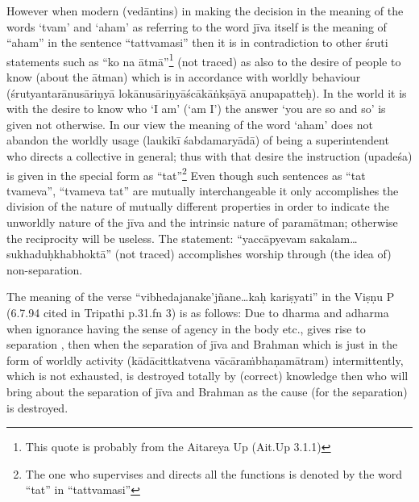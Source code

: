 However when modern (vedāntins) in making the decision in the meaning of the words ‘tvam’ and ‘aham’ as referring to    the word jīva itself is the meaning of “aham” in the sentence “tattvamasi” then it is in contradiction to other śruti statements such as “ko na ātmā”\footnote{This quote is probably from the Aitareya Up (Ait.Up 3.1.1)} (not traced) as also to the desire of people to know (about the ātman)  which is in accordance with worldly behaviour (śrutyantarānusāriṇyā lokānusāriṇyāścākāṅkṣāyā anupapatteḥ). In the world it is with the desire to know who ‘I am’ (`am I') the answer ‘you are so and so’ is given not otherwise. In our view the meaning of the word ‘aham’ does not abandon the worldly usage (laukikī śabdamaryādā) of being a superintendent who directs a collective in general; thus with that desire the instruction (upadeśa) is given in the special form as “tat”\footnote{The one who supervises and directs all the functions is denoted by the word “tat” in “tattvamasi”} Even though such sentences as “tat tvameva”, “tvameva tat” are mutually interchangeable it only accomplishes the division of the nature of mutually different properties in order to indicate the unworldly nature of the jīva and the intrinsic nature of paramātman; otherwise the reciprocity will be useless. The statement: “yaccāpyevam sakalam…sukhaduḥkhabhoktā” (not traced) accomplishes worship through (the idea of) non-separation.

The meaning of the verse “vibhedajanake’jñane…kaḥ kariṣyati” in the Viṣṇu P  (6.7.94 cited in Tripathi p.31.fn 3) is as follows: Due to dharma and adharma when ignorance having the sense of agency in the body etc., gives rise to separation , then when the separation of jīva and Brahman which is just in the form of worldly activity (kādācittkatvena vācāraṁbhaṇamātram) intermittently, which is not exhausted, is destroyed totally by (correct) knowledge then who will bring about the separation of jīva and Brahman as the cause (for the separation) is destroyed.

